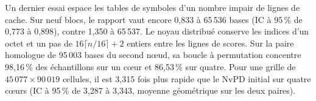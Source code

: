 Un dernier essai espace les tables de symboles d’un nombre impair de lignes de cache. Sur neuf blocs, le rapport vaut encore 0,833 à 65\,536 bases (IC à 95\,\% de 0,773 à 0,898), contre 1,350 à 65\,537. Le noyau distribué conserve les indices d’un octet et un pas de \(16\lceil n/16\rceil+2\) entiers entre les lignes de scores. Sur la paire homologue de 95\,003 bases du second nœud, sa boucle à permutation concentre 98,16\,\% des échantillons sur un cœur et 86,53\,\% sur quatre. Pour une grille de \(45\,077\times90\,019\) cellules, il est 3,315 fois plus rapide que le NvPD initial sur quatre cœurs (IC à 95\,\% de 3,287 à 3,343, moyenne géométrique sur les deux paires).

